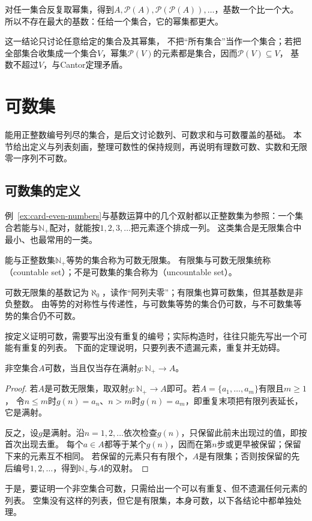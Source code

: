 对任一集合反复取幂集，得到$A,\mathcal P(A),\mathcal P(\mathcal P(A)),\ldots$，基数一个比一个大。
所以不存在最大的基数：任给一个集合，它的幂集都更大。

这一结论只讨论任意给定的集合及其幂集，
不把“所有集合”当作一个集合；若把全部集合收集成一个集合$V$，幂集$\mathcal P(V)$的元素都是集合，因而$\mathcal P(V)\subseteq V$，
基数不超过$V$，与Cantor定理矛盾。

\section{可数集}
\label{sec:comb-countable-sets}

能用正整数编号列尽的集合，是后文讨论数列、可数求和与可数覆盖的基础。
本节给出定义与列表刻画，整理可数性的保持规则，再说明有理数可数、实数和无限零一序列不可数。

\subsection{可数集的定义}
\label{sec:countable-set-definition}

例~\ref{ex:card-even-numbers}与基数运算中的几个双射都以正整数集为参照：一个集合若能与$\mathbb N_+$配对，就能按$1,2,3,\ldots$把元素逐个排成一列。
这类集合是无限集合中最小、也最常用的一类。

\begin{definition}[可数集]
\label{def:analysis-countable-set}
能与正整数集$\mathbb N_+$等势的集合称为可数无限集。
有限集与可数无限集统称（countable set）；不是可数集的集合称为（uncountable set）。
\end{definition}
可数无限集的基数记为$\aleph_0$，读作“阿列夫零”；有限集也算可数集，但其基数是非负整数。
由等势的对称性与传递性，与可数集等势的集合仍可数，与不可数集等势的集合仍不可数。

按定义证明可数，需要写出没有重复的编号；实际构造时，往往只能先写出一个可能有重复的列表。
下面的定理说明，只要列表不遗漏元素，重复并无妨碍。
\begin{theorem}[可数集的列表刻画]
\label{thm:comb-countable-surjection}
非空集合$A$可数，当且仅当存在满射$g:\mathbb N_+\to A$。
\end{theorem}
\begin{proof}
若$A$是可数无限集，取双射$g:\mathbb N_+\to A$即可。若$A=\{a_1,\ldots,a_m\}$有限且$m\geq1$，
令$n\leq m$时$g(n)=a_n$、$n>m$时$g(n)=a_m$，即重复末项把有限列表延长，它是满射。

反之，设$g$是满射。沿$n=1,2,\ldots$依次检查$g(n)$，只保留此前未出现过的值，即按首次出现去重。
每个$a\in A$都等于某个$g(n)$，因而在第$n$步或更早被保留；保留下来的元素互不相同。
若保留的元素只有有限个，$A$是有限集；否则按保留的先后编号$1,2,\ldots$，得到$\mathbb N_+$与$A$的双射。
\end{proof}
于是，要证明一个非空集合可数，只需给出一个可以有重复、但不遗漏任何元素的列表。
空集没有这样的列表，但它是有限集，本身可数，以下各结论中都单独处理。

